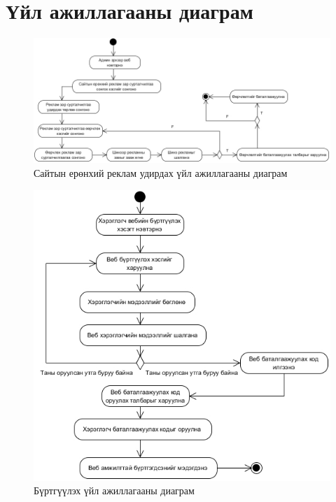 \section{Үйл ажиллагааны диаграм}
\begin{figure}
	\centering
	\includegraphics[scale=0.5]{Diagrams/change}
	\caption[Сайтын ерөнхий реклам удирдах үйл ажиллагааны диаграм]{Сайтын ерөнхий реклам удирдах үйл ажиллагааны диаграм}
	\label{text}
\end{figure}
\begin{figure}
	\centering
	\includegraphics[scale=0.75]{Diagrams/sign_up}
	\caption[Бүртгүүлэх үйл ажиллагааны диаграм]{Бүртгүүлэх үйл ажиллагааны диаграм}
	\label{text}
\end{figure}
